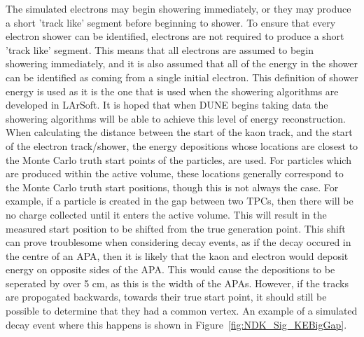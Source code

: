 The simulated electrons may begin showering immediately, or they may produce a short 'track like' segment before beginning to shower. To ensure that every electron shower can be identified, electrons are not required to produce a short 'track like' segment. This means that all electrons are assumed to begin showering immediately, and it is also assumed that all of the energy in the shower can be identified as coming from a single initial electron. This definition of shower energy is used as it is the one that is used when the showering algorithms are developed in LArSoft. It is hoped that when DUNE begins taking data the showering algorithms will be able to achieve this level of energy reconstruction. \\

When calculating the distance between the start of the kaon track, and the start of the electron track/shower, the energy depositions whose locations are closest to the Monte Carlo truth start points of the particles, are used. For particles which are produced within the active volume, these locations generally correspond to the Monte Carlo truth start positions, though this is not always the case. For example, if a particle is created in the gap between two TPCs, then there will be no charge collected until it enters the active volume. This will result in the measured start position to be shifted from the true generation point. This shift can prove troublesome when considering decay events, as if the decay occured in the centre of an APA, then it is likely that the kaon and electron would deposit energy on opposite sides of the APA. This would cause the depositions to be seperated by over 5 cm, as this is the width of the APAs. However, if the tracks are propogated backwards, towards their true start point, it should still be possible to determine that they had a common vertex. An example of a simulated decay event where this happens is shown in Figure~\ref{fig:NDK_Sig_KEBigGap}. \\

